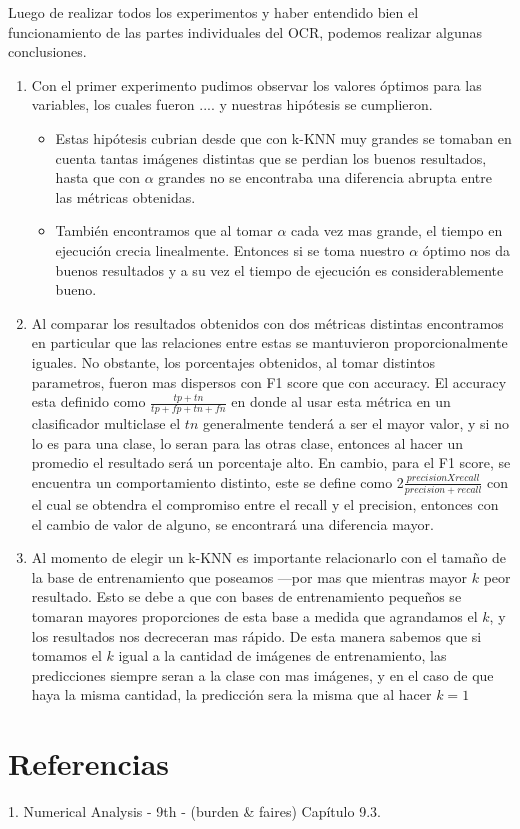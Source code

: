 Luego de realizar todos los experimentos y haber entendido bien el funcionamiento de las partes individuales del OCR, podemos realizar algunas conclusiones.

\begin{enumerate}
	\item Con el primer experimento pudimos observar los valores óptimos para las variables, los cuales fueron .... y nuestras hipótesis se cumplieron. 
	\begin{itemize}
		\item Estas hipótesis cubrian desde que con k-KNN muy grandes se tomaban en cuenta tantas imágenes distintas que se perdian los buenos resultados, hasta que con $\alpha$ grandes no se encontraba una diferencia abrupta entre las métricas obtenidas.
		\item También encontramos que al tomar $\alpha$ cada vez mas grande, el tiempo en ejecución crecia linealmente. Entonces si se toma nuestro $\alpha$ óptimo nos da buenos resultados y a su vez el tiempo de ejecución es considerablemente bueno.
	\end{itemize}
	\item Al comparar los resultados obtenidos con dos métricas distintas encontramos en particular que las relaciones entre estas se mantuvieron proporcionalmente iguales. No obstante, los porcentajes obtenidos, al tomar distintos parametros, fueron mas dispersos con F1 score que con accuracy. El accuracy esta definido como $\frac{tp + tn}{tp + fp + tn + fn}$ en donde al usar esta métrica en un clasificador multiclase el $tn$ generalmente tenderá a ser el mayor valor, y si no lo es para una clase, lo seran para las otras clase, entonces al hacer un promedio el resultado será un porcentaje alto. En cambio, para el F1 score, se encuentra un comportamiento distinto, este se define como 2$\frac{precisionXrecall}{precision + recall}$ con el cual se obtendra el compromiso entre el recall y el precision, entonces con el cambio de valor de alguno, se encontrará una diferencia mayor.
	\item Al momento de elegir un k-KNN es importante relacionarlo con el tamaño de la base de entrenamiento que poseamos ---por mas que mientras mayor $k$ peor resultado. Esto se debe a que con bases de entrenamiento pequeños se tomaran mayores proporciones de esta base a medida que agrandamos el $k$, y los resultados nos decreceran mas rápido. De esta manera sabemos que si tomamos el $k$ igual a la cantidad de imágenes de entrenamiento, las predicciones siempre seran a la clase con mas imágenes, y en el caso de que haya la misma cantidad, la predicción sera la misma que al hacer $k = 1$


\end{enumerate}


\section{Referencias}
1. Numerical Analysis - 9th - (burden & faires) Capítulo 9.3.